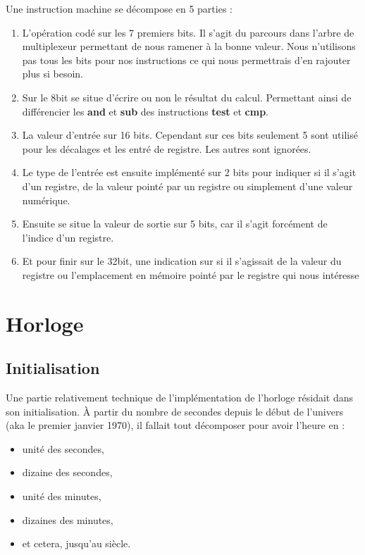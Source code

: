 \documentclass[10pt,a4paper,notitlepage ]{report}
\begin{document}
		Une instruction machine se décompose en 5 parties : 
		\begin{enumerate}
			\item L'opération codé sur les 7 premiers bits. Il s'agit du parcours dans l'arbre de multiplexeur permettant de nous ramener à la bonne valeur. Nous n'utilisons pas tous les bits pour nos instructions ce qui nous permettrais d'en rajouter plus si besoin.

			\item Sur le 8\ieme bit se situe d'écrire ou non le résultat du calcul. Permettant ainsi de différencier les \textbf{and} et \textbf{sub} des instructions \textbf{test} et \textbf{cmp}.

			\item La valeur d'entrée sur 16 bits. Cependant sur ces bits seulement 5 sont utilisé pour les décalages et les entré de registre. Les autres sont ignorées.

			\item Le type de l'entrée est ensuite implémenté sur 2 bits pour indiquer si il s'agit d'un registre, de la valeur pointé par un registre ou simplement d'une valeur numérique.

			\item Ensuite se situe la valeur de sortie sur 5 bits, car il s'agit forcément de l'indice d'un registre.

			\item Et pour finir sur le 32\ieme bit, une indication sur si il s'agissait de la valeur du registre ou l'emplacement en mémoire pointé par le registre qui nous intéresse
		\end{enumerate}


	\section{Horloge}

		\subsection{Initialisation}

			Une partie relativement technique de l'implémentation de l'horloge résidait dans son initialisation. À partir du nombre de secondes depuis le début de l'univers (aka le premier janvier 1970), il fallait tout décomposer pour avoir l'heure en :
			\begin{itemize}
				\item unité des secondes,
				\item dizaine des secondes,
				\item unité des minutes,
				\item dizaines des minutes,
				\item et cetera, jusqu'au siècle.
			\end{itemize}
\end{document}
